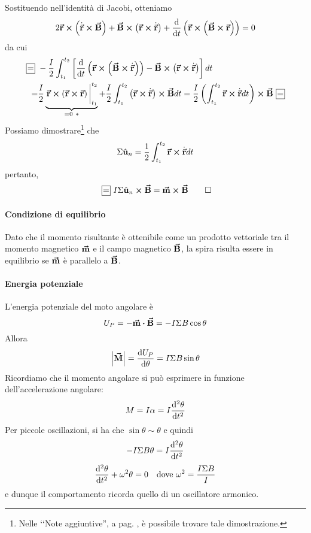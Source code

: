 \begin{demonstration}
	Sostituendo nell'identità di Jacobi, otteniamo
	\begin{equation*}
		2\vb*{\va{r}}\cross\left(\dot{\vec{\mathbf{r}}}\cross\vb*{\va{B}}\right)+\vb*{\va{B}}\cross\left(\vb*{\va{r}}\cross\dot{\vec{\mathbf{r}}}\right)+\dv{t}\left(\vb*{\va{r}}\cross\left(\vb*{\va{B}}\cross\vb*{\va{r}}\right)\right)=0
	\end{equation*}
	da cui
	\begin{align*}
		\squarequal& -\frac{I}{2}\int_{t_1}^{t_2}\left[\dv{t}\left(\vba{r}\cross\left(\vba{B}\cross\vbd{r}\right)\right)-\vba{B}\cross\left(\vba{r}\cross\vbd{r}\right)\right]dt\\
		=&\frac{I}{2}\underbrace{\eval{\vba{r}\cross\left(\vba{r}\cross\vba{r}\right)}_{t_1}^{t_2}}_{=0\ \ast}+\frac{I}{2}\int_{t_1}^{t_2}\left(\vba{r}\cross\vbd{r}\right)\cross\vba{B}dt=\frac{I}{2}\left(\int_{t_1}^{t_2}\vba{r}\cross\vbd{r}dt\right)\cross\vba{B}\squarequal
	\end{align*}
	Possiamo dimostrare\footnote{Nelle ‘‘Note aggiuntive'', a pag. \pageref{AreaCurvaDelimitata}, è possibile trovare tale dimostrazione.} che
	\begin{equation*}
		\Sigma\hat{\mathbf{u}}_n=\frac{1}{2}\int_{t_1}^{t_2}\vb*{\va{r}}\cross\dot{\vec{\mathbf{r}}}dt
	\end{equation*}
pertanto,
\begin{equation*}
	\squarequal I\Sigma\vbh{u}_n\cross \vba{B}=\vba{m}\cross\vba{B}\qedhere
\end{equation*}
\end{demonstration}
\paragraph{Condizione di equilibrio}
Dato che il momento risultante è ottenibile come un prodotto vettoriale tra il momento magnetico $\vb*{\va{m}}$ e il campo magnetico $\vb*{\va{B}}$, la spira risulta essere in equilibrio se $\vb*{\va{m}}$ è parallelo a $\vb*{\va{B}}$.
\paragraph{Energia potenziale}
L'energia potenziale del moto angolare è
\begin{equation}
	U_P=-\vba{m}\vdot\vba{B}=-I\Sigma B\cos\theta
\end{equation}
Allora
\begin{equation}
	\abs{\vb*{\va{M}}}=\dv{U_P}{\theta}=I\Sigma B\sin\theta
\end{equation}\label{EnergiaPotenzialeCasoGeneralemanontroppo}
Ricordiamo che il momento angolare si può esprimere in funzione dell'accelerazione angolare:
\begin{equation}
	M=I\alpha=I\dv[2]{\theta}{t}
\end{equation}
Per piccole oscillazioni, si ha che $\sin\theta\sim\theta$ e quindi
\begin{equation*}
	-I\Sigma B\theta=I\dv[2]{\theta}{t}
\end{equation*}
\begin{align}
	\dv[2]{\theta}{t}+\omega^2\theta=0&&\text{dove}\ \omega^2=\frac{I\Sigma B}{I}
\end{align}
e dunque il comportamento ricorda quello di un oscillatore armonico.
